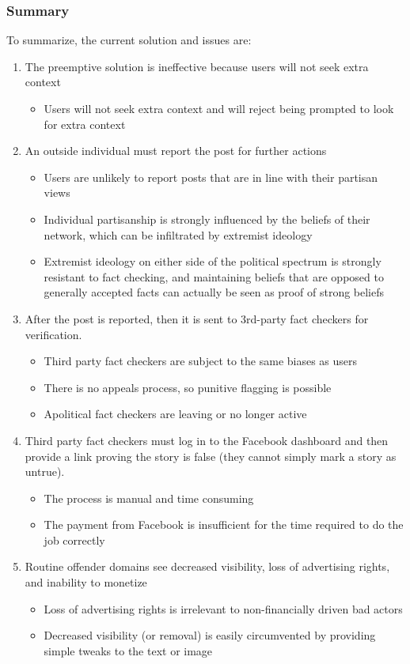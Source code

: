 \documentclass[12pt]{article}
\begin{document}
\subsubsection{Summary}
To summarize, the current solution and issues are:
\renewcommand{\labelenumii}{\Roman{enumii}}
\begin{enumerate}
\item The preemptive solution is ineffective because users will not seek extra context
\begin{itemize}
\item Users will not seek extra context and will reject being prompted to look for extra context
\end{itemize}
\item An outside individual must report the post for further actions
 \begin{itemize}
     \item Users are unlikely to report posts that are in line with their partisan views
     \item Individual partisanship is strongly influenced by the beliefs of their network, which can be infiltrated by extremist ideology
     \item Extremist ideology on either side of the political spectrum is strongly resistant to fact checking, and maintaining beliefs that are opposed to generally accepted facts can actually be seen as proof of strong beliefs
    \end{itemize}
     \item After the post is reported, then it is  sent to 3rd-party fact checkers for verification. 
     \begin{itemize}
         \item Third party fact checkers are subject to the same biases as users
         \item There is no appeals process, so punitive flagging is possible
         \item Apolitical fact checkers are leaving or no longer active
     \end{itemize}
     \item Third party fact checkers must log in to the Facebook dashboard and then provide a link proving the story is false (they cannot simply mark a story as untrue).
     \begin{itemize}
         \item The process is manual and time consuming
         \item The payment from Facebook is insufficient for the time required to do the job correctly
     \end{itemize}
     \item Routine offender domains see decreased visibility, loss of advertising rights, and inability to monetize
     \begin{itemize}
         \item Loss of advertising rights is irrelevant to non-financially driven bad actors
         \item Decreased visibility (or removal) is easily circumvented by providing simple tweaks to the text or image
     \end{itemize}
 \end{enumerate}
\end{document}

